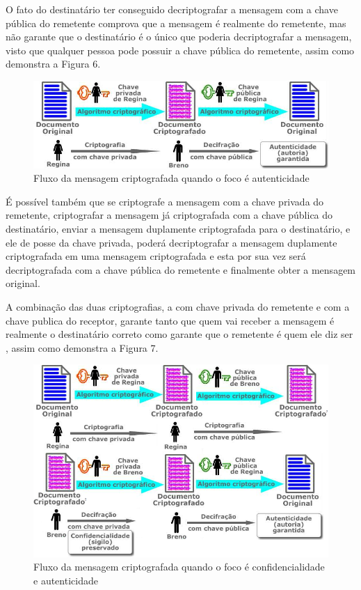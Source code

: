 O fato do destinatário ter conseguido decriptografar a mensagem com a chave pública do remetente comprova que a mensagem é realmente do remetente, mas não garante que o destinatário é o único que poderia decriptografar a mensagem, visto que qualquer pessoa pode possuir a chave pública do remetente, assim como demonstra a Figura 6.

\begin{figure}[H]
    \centering
    \caption{Fluxo da mensagem criptografada quando o foco é autenticidade}
    \includegraphics[width=.8\linewidth]{Figuras/Autencidade.png}
\end{figure}

É possível também que se criptografe a mensagem com a chave privada do remetente, criptografar a mensagem já criptografada com a chave pública do destinatário, enviar a mensagem duplamente criptografada para o destinatário, e ele de posse da chave privada, poderá decriptografar a mensagem duplamente criptografada em uma mensagem criptografada e esta por sua vez será decriptografada com a chave pública do remetente e finalmente obter a mensagem original.

A combinação das duas criptografias, a com chave privada do remetente e com a chave publica do receptor, garante tanto que quem vai receber a mensagem é realmente o destinatário correto como garante que o remetente é quem ele diz ser \cite{stallings14}, assim como demonstra a Figura 7.

\begin{figure}[H]
    \centering
    \caption{Fluxo da mensagem criptografada quando o foco é confidencialidade e autenticidade}
    \includegraphics[width=.8\linewidth]{Figuras/ConfidEAuten.png}
\end{figure}

